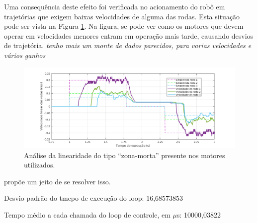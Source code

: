 Uma consequência deste efeito foi verificada no acionamento do robô em trajetórias que exigem baixas velocidades de alguma das rodas. Esta situação pode ser vista na Figura \ref{fig:zm3rodas}. Na figura, se pode ver como os motores que devem operar em velocidades menores entram em operação mais tarde, causando desvios de trajetória. \textit{tenho mais um monte de dados parecidos, para varias velocidades e vários ganhos}

\begin{figure}[h]
  \centering
  \includegraphics[width = \textwidth]{imagens/zm3rodas}
  \caption{Análise da linearidade do tipo ``zona-morta'' presente nos motores utilizados.}
  \label{fig:zm3rodas}
\end{figure}


\cite{cunha2001zm} propõe um jeito de se resolver isso.

Desvio padrão do tmepo de execução do loop: 16,68573853

Tempo médio a cada chamada do loop de controle, em $\mu$s: 10000,03822
